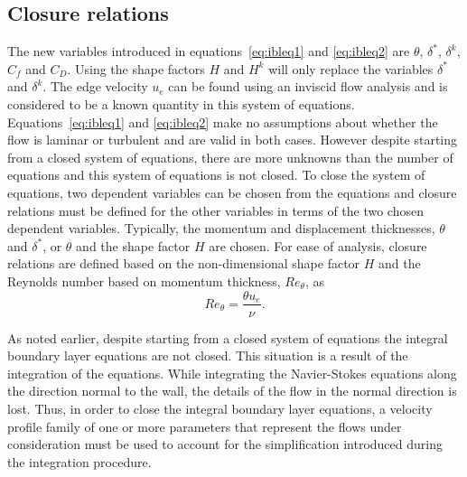 \subsection{Closure relations}
The new variables introduced in equations~\ref{eq:ibleq1} and \ref{eq:ibleq2} are $\theta$, $\delta^*$, $\delta^k$, $C_f$ and $C_D$. Using the shape factors $H$ and $H^k$ will only replace the variables $\delta^{\ast}$ and $\delta^k$. The edge velocity $u_e$ can be found using an inviscid flow analysis and is considered to be a known quantity in this system of equations. Equations~\ref{eq:ibleq1} and \ref{eq:ibleq2} make no assumptions about whether the flow is laminar or turbulent and are valid in both cases. However despite starting from a closed system of equations, there are more unknowns than the number of equations and this system of equations is not closed. To close the system of equations, two dependent variables can be chosen from the equations and closure relations must be defined for the other variables in terms of the two chosen dependent variables. Typically, the momentum and displacement thicknesses, $\theta$ and $\delta^{\ast}$, or $\theta$ and the shape factor $H$ are chosen. For ease of analysis, closure relations are defined based on the non-dimensional shape factor $H$ and the Reynolds number based on momentum thickness, $Re_{\theta}$, as 
\begin{equation*}
Re_{\theta} = \frac{\theta u_e}{\nu}.
\end{equation*}

As noted earlier, despite starting from a closed system of equations the integral boundary layer equations are not closed. This situation is a result of the integration of the equations. While integrating the Navier-Stokes equations along the direction normal to the wall, the details of the flow in the normal direction is lost. Thus, in order to close the integral boundary layer equations, a velocity profile family of one or more parameters that represent the flows under consideration must be used to account for the simplification introduced during the integration procedure. 

